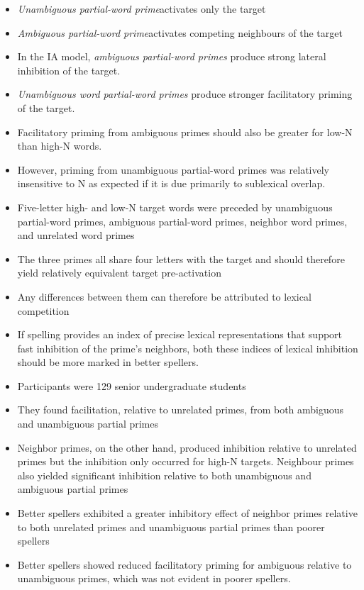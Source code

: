 \documentclass[]{article}
\begin{document}
		\begin{itemize}
			\item \textit{Unambiguous partial-word prime}\textendash activates only the target
			\item \textit{Ambiguous partial-word prime}\textendash activates competing neighbours of the target
			\item In the IA model, \textit{ambiguous partial-word primes} produce strong lateral inhibition of the target. 
			\item \textit{Unambiguous word partial-word primes} produce stronger facilitatory priming of the target.  
			\item  Facilitatory priming from ambiguous primes should also be greater for low-N than high-N words. 
			\item However, priming from unambiguous partial-word primes was relatively insensitive to N as expected if it is due primarily to sublexical overlap.
			\item Five-letter high- and low-N target words were preceded by unambiguous partial-word primes, ambiguous partial-word primes, neighbor word primes, and unrelated word primes
			\item The three primes all share four letters with the target and should therefore yield relatively equivalent target pre-activation
			\item Any differences between them can therefore be attributed to lexical competition
			\item If spelling provides an index of precise lexical representations that support fast inhibition of the prime’s neighbors, both these indices of lexical inhibition should be more marked in better spellers.
			\item Participants were 129 senior undergraduate students 
			\item They found facilitation, relative to unrelated primes, from both ambiguous and unambiguous partial primes
			\item Neighbor primes, on the other hand, produced inhibition relative to unrelated primes but the inhibition only occurred for high-N targets.  Neighbour primes also yielded significant inhibition relative to both unambiguous and ambiguous partial primes
			\item Better spellers exhibited a greater inhibitory effect of neighbor primes relative to both unrelated primes and unambiguous partial primes than poorer spellers
			\item Better spellers showed reduced facilitatory priming for ambiguous relative to unambiguous primes, which was not evident in poorer spellers.
			
		\end{itemize}
	
\end{document}
